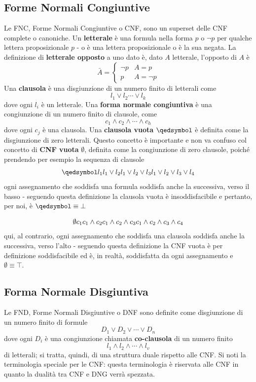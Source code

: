 \subsection{Forme Normali Congiuntive}
Le FNC, Forme Normali Congiuntive o CNF, sono un superset delle CNF complete o canoniche.
Un \textbf{letterale} è una formula nella forma $p$ o $\neg p$ per qualche 
lettera proposizionale $p$ - o è una lettera proposizionale o è la sua negata. 
La definizione di \textbf{letterale opposto} a uno dato è, dato $A$ letterale, 
l'opposto di $A$ è
$$
\bar{A} = 
\begin{cases}
  \neg p & A = p \\
  p & A = \neg p
\end{cases}
$$
Una \textbf{clausola} è una disgiunzione di un numero finito di letterali come 
$$
l_1 \lor l_2 \cdots \lor l_k
$$
dove ogni $l_i$ è un letterale. 
Una \textbf{forma normale congiuntiva} è una congiunzione di un numero finito di 
clausole, come 
$$
c_1 \land c_2 \land \cdots \land c_h
$$
dove ogni $c_j$ è una clausola. 
Una \textbf{clausola vuota} $\qedsymbol$ è definita come la disgiunzione 
di zero letterali. Questo concetto è importante e non va confuso col concetto 
di \textbf{CNF vuota} $\emptyset$, definita come la congiunzione di zero clausole, 
poiché prendendo per esempio la sequenza di clausole 
$$
\qedsymbol \\
l_1 \\
l_1 \lor l_2 \\
l_1 \lor l_2 \lor l_3 \\
l_1 \lor l_2 \lor l_3 \lor l_4
$$
ogni assegnamento che soddisfa una formula soddisfa anche la successiva, verso 
il basso - seguendo questa definizione la clausola vuota è insoddisfacibile e 
pertanto, per noi, è $\qedsymbol \equiv \bot$

$$
\emptyset \\
c_1 \\
c_1 \land c_2 \\
c_1 \land c_2 \land c_3\\
c_1 \land c_2 \land c_3 \land c_4
$$
qui, al contrario, ogni assegnamento che soddisfa una clausola soddisfa anche la 
successiva, verso l'alto - seguendo questa definizione la CNF vuota è per 
definizione soddisfacibile ed è, in realtà, soddisfatta da ogni assegnamento 
e $\emptyset \equiv \top$. 

\subsection{Forma Normale Disgiuntiva}
Le FND, Forme Normali Disgiuntive o DNF sono definite come disgiunzione di 
un numero finito di formule 
$$
D_1 \lor D_2 \lor \cdots \lor D_n
$$
dove ogni $D_i$ è una congiunzione chiamata \textbf{co-clausola} di un numero finito 
$$
l_1 \land l_2 \land \cdots \land l_v
$$
di letterali; si tratta, quindi, di una struttura duale rispetto alle CNF. 
Si noti la terminologia speciale per le CNF: questa terminologia è riservata 
alle CNF in quanto la dualità tra CNF e DNG verrà spezzata. 

